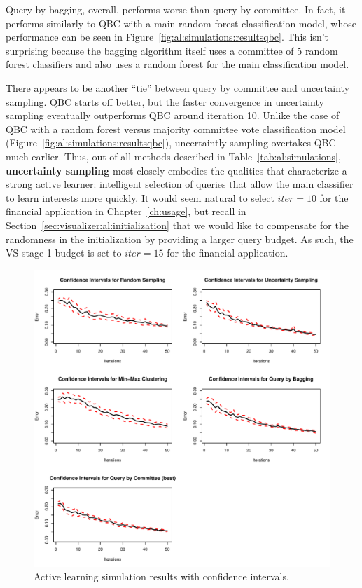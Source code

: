 Query by bagging, overall, performs worse than query by committee. In fact, it 
performs similarly to QBC with a main random forest classification model, whose 
performance can be seen in Figure~\ref{fig:al:simulations:resultsqbc}. 
This isn't surprising because the bagging algorithm itself uses a committee of 
5 random forest classifiers and also uses a random forest for the main 
classification model. 

There appears to be another ``tie'' between query by committee and uncertainty 
sampling. QBC starts off better, but the faster convergence in uncertainty 
sampling eventually outperforms QBC around iteration 10. Unlike the case of QBC 
with a random forest versus majority committee vote classification model 
(Figure~\ref{fig:al:simulations:resultsqbc}), uncertaintly sampling overtakes 
QBC much earlier. Thus, out of all methods described in 
Table~\ref{tab:al:simulations}, \textbf{uncertainty sampling} most closely 
embodies the qualities that characterize a strong active learner: intelligent 
selection of queries that allow the main classifier to learn interests more 
quickly. It would seem natural to select $iter = 10$ for the financial 
application in Chapter~\ref{ch:usage}, but recall in 
Section~\ref{sec:visualizer:al:initialization} that we would like to compensate 
for the randomness in the initialization by providing a larger query budget. As 
such, the VS stage 1 budget is set to $iter = 15$ for the financial application.

\begin{figure}[htb]
	\begin{center}
		\includegraphics[width=1\linewidth]{ch-al/figures/results_ci.pdf}
		\caption[Active learning simulation results with confidence 
		intervals.]{Active learning simulation results with confidence 
		intervals.}
		\label{fig:al:simulations:resultsci}
	\end{center}
\end{figure}

